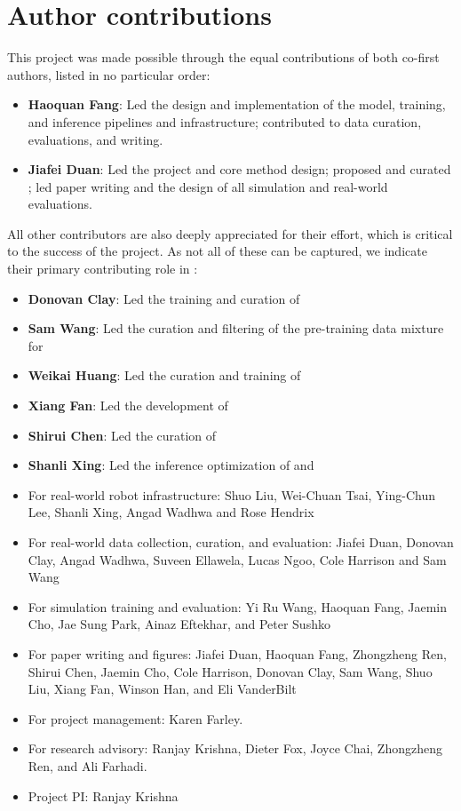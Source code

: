 \section*{Author contributions}
\label{sec:contrib}
This project was made possible through the equal contributions of both co-first authors, listed in no particular order:
\begin{itemize}
    \item \textbf{Haoquan Fang}: Led the design and implementation of the \molmoactt model, training, and inference pipelines and infrastructure; contributed to data curation, evaluations, and writing.
    \item \textbf{Jiafei Duan}: Led the project and core method design; proposed and curated \molmoacttyamdata; led paper writing and the design of all simulation and real-world evaluations.
\end{itemize}

All other contributors are also deeply appreciated for their effort, which is critical to the success of the \molmoactt project. As not all of these can be captured, we indicate their primary contributing role in \molmoactt:
\begin{itemize}
    \item \textbf{Donovan Clay}: Led the training and curation of \molmoactfast
    \item \textbf{Sam Wang}: Led the curation and filtering of the pre-training data mixture for \molmoactt
    \item \textbf{Weikai Huang}: Led the curation and training of \molmoer
    \item \textbf{Xiang Fan}: Led the development of \molmothink
    \item \textbf{Shirui Chen}: Led the curation of \molmoacttsodata
    \item \textbf{Shanli Xing}: Led the inference optimization of \molmoactt and \molmothink
    \item For real-world robot infrastructure: Shuo Liu, Wei-Chuan Tsai, Ying-Chun Lee, Shanli Xing, Angad Wadhwa and Rose Hendrix
    \item For real-world data collection, curation, and evaluation: Jiafei Duan,  Donovan Clay, Angad Wadhwa, Suveen Ellawela, Lucas Ngoo, Cole Harrison and Sam Wang
    \item For simulation training and evaluation: Yi Ru Wang, Haoquan Fang, Jaemin Cho, Jae Sung Park, Ainaz Eftekhar, and Peter Sushko
    \item For paper writing and figures: Jiafei Duan, Haoquan Fang, Zhongzheng Ren,  Shirui Chen, Jaemin Cho, Cole Harrison, Donovan Clay, Sam Wang, Shuo Liu, Xiang Fan, Winson Han, and Eli VanderBilt
    \item For project management: Karen Farley.
    \item For research advisory: Ranjay Krishna, Dieter Fox, Joyce Chai, Zhongzheng Ren, and Ali Farhadi.
    \item Project PI: Ranjay Krishna
\end{itemize}


